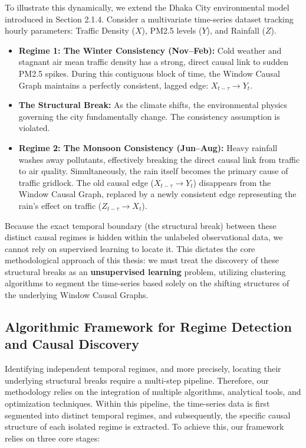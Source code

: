 To illustrate this dynamically, we extend the Dhaka City environmental model introduced in Section 2.1.4. Consider a multivariate time-series dataset tracking hourly parameters: Traffic Density ($X$), PM2.5 levels ($Y$), and Rainfall ($Z$). 

\begin{itemize}
    \item \textbf{Regime 1: The Winter Consistency (Nov--Feb):} Cold weather and stagnant air mean traffic density has a strong, direct causal link to sudden PM2.5 spikes. During this contiguous block of time, the Window Causal Graph maintains a perfectly consistent, lagged edge: $X_{t-\tau} \rightarrow Y_t$.
    \item \textbf{The Structural Break:} As the climate shifts, the environmental physics governing the city fundamentally change. The consistency assumption is violated.
    \item \textbf{Regime 2: The Monsoon Consistency (Jun--Aug):} Heavy rainfall washes away pollutants, effectively breaking the direct causal link from traffic to air quality. Simultaneously, the rain itself becomes the primary cause of traffic gridlock. The old causal edge ($X_{t-\tau} \rightarrow Y_t$) disappears from the Window Causal Graph, replaced by a newly consistent edge representing the rain's effect on traffic ($Z_{t-\tau} \rightarrow X_t$).
\end{itemize}

Because the exact temporal boundary (the structural break) between these distinct causal regimes is hidden within the unlabeled observational data, we cannot rely on supervised learning to locate it. This dictates the core methodological approach of this thesis: we must treat the discovery of these structural breaks as an \textbf{unsupervised learning} problem, utilizing clustering algorithms to segment the time-series based solely on the shifting structures of the underlying Window Causal Graphs.


\subsection{Algorithmic Framework for Regime Detection and Causal Discovery}

Identifying independent temporal regimes, and more precisely, locating their underlying structural breaks require a multi-step pipeline. Therefore, our methodology relies on the integration of multiple algorithms, analytical tools, and optimization techniques. Within this pipeline, the time-series data is first segmented into distinct temporal regimes, and subsequently, the specific causal structure of each isolated regime is extracted. To achieve this, our framework relies on three core stages:

